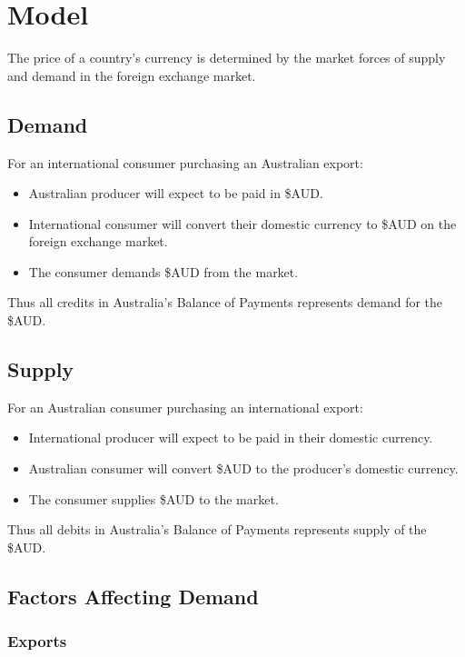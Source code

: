 \documentclass[a4paper,11pt]{article}
\begin{document}
\section{Model}

The price of a country's currency is determined by the market forces of supply
and demand in the foreign exchange market.


\subsection{Demand}

For an international consumer purchasing an Australian export:

\begin{itemize}
\item Australian producer will expect to be paid in \$AUD.
\item International consumer will convert their domestic currency to \$AUD on
	the foreign exchange market.
\item The consumer demands \$AUD from the market.
\end{itemize}

Thus all credits in Australia's Balance of Payments represents demand for the
\$AUD.


\subsection{Supply}

For an Australian consumer purchasing an international export:

\begin{itemize}
\item International producer will expect to be paid in their domestic currency.
\item Australian consumer will convert \$AUD to the producer's domestic
	currency.
\item The consumer supplies \$AUD to the market.
\end{itemize}

Thus all debits in Australia's Balance of Payments represents supply of the
\$AUD.


\subsection{Factors Affecting Demand}

\subsubsection{Exports}
\end{document}

